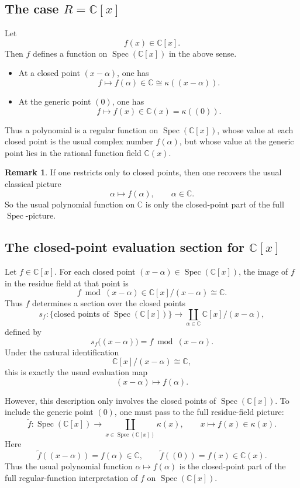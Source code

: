 \documentclass[11pt]{article}
\theoremstyle{definition}
\newtheorem{remark}[theorem]{Remark}
\newcommand{\C}{\mathbb{C}}
\newcommand{\Spec}{\operatorname{Spec}}
\newcommand{\kk}[1]{\kappa\!\left(#1\right)}
\begin{document}
	\subsection{The case \texorpdfstring{$R=\C[x]$}{R=C[x]}}
	
	Let
	\[
	f(x)\in \C[x].
	\]
	Then \(f\) defines a function on \(\Spec(\C[x])\) in the above sense.
	
	\begin{itemize}
		\item At a closed point \((x-\alpha)\), one has
		\[
		f \longmapsto f(\alpha)\in \C \cong \kk{(x-\alpha)}.
		\]
		
		\item At the generic point \((0)\), one has
		\[
		f \longmapsto f(x)\in \C(x)=\kk{(0)}.
		\]
	\end{itemize}
	
	Thus a polynomial is a regular function on \(\Spec(\C[x])\), whose value at each closed point is the usual complex number \(f(\alpha)\), but whose value at the generic point lies in the rational function field \(\C(x)\).
	
	\begin{remark}
		If one restricts only to closed points, then one recovers the usual classical picture
		\[
		\alpha\longmapsto f(\alpha),\qquad \alpha\in \C.
		\]
		So the usual polynomial function on \(\C\) is only the closed-point part of the full \(\Spec\)-picture.
	\end{remark}
	
	\subsection{The closed-point evaluation section for \texorpdfstring{$\C[x]$}{C[x]}}
	
	Let \(f\in \C[x]\). For each closed point \((x-\alpha)\in \Spec(\C[x])\), the image of \(f\) in the residue field at that point is
	\[
	f \bmod (x-\alpha)\in \C[x]/(x-\alpha)\cong \C.
	\]
	Thus \(f\) determines a section over the closed points
	\[
	s_f:\{\text{closed points of }\Spec(\C[x])\}\longrightarrow
	\coprod_{\alpha\in\C}\C[x]/(x-\alpha),
	\]
	defined by
	\[
	s_f\bigl((x-\alpha)\bigr)=f \bmod (x-\alpha).
	\]
	Under the natural identification
	\[
	\C[x]/(x-\alpha)\cong \C,
	\]
	this is exactly the usual evaluation map
	\[
	(x-\alpha)\longmapsto f(\alpha).
	\]
	
	However, this description only involves the closed points of \(\Spec(\C[x])\).  
	To include the generic point \((0)\), one must pass to the full residue-field picture:
	\[
	\widetilde f:\Spec(\C[x])\longrightarrow \coprod_{x\in \Spec(\C[x])}\kk{x},
	\qquad
	x\longmapsto f(x)\in \kk{x}.
	\]
	Here
	\[
	\widetilde f((x-\alpha))=f(\alpha)\in \C,
	\qquad
	\widetilde f((0))=f(x)\in \C(x).
	\]
	Thus the usual polynomial function \(\alpha\mapsto f(\alpha)\) is the closed-point part of the full regular-function interpretation of \(f\) on \(\Spec(\C[x])\).
	
\end{document}
